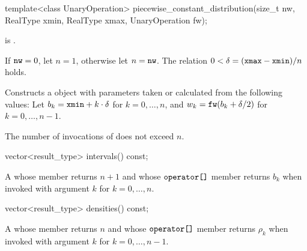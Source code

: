 %
\begin{itemdecl}
template<class UnaryOperation>
 piecewise_constant_distribution(size_t nw, RealType xmin, RealType xmax, UnaryOperation fw);
\end{itemdecl}

\begin{itemdescr}
\pnum
\mandates
{} is .

\pnum
\expects
 If $\texttt{\protect nw} = 0$, let $n = 1$, otherwise let $n = \texttt{\protect nw}$.
 The relation $0 < \delta = (\texttt{\protect xmax} - \texttt{\protect xmin}) / n$
 holds.

\pnum
\effects
Constructs a  object
 with parameters taken or calculated
 from the following values:
 Let $b_k = \texttt{\protect xmin} + k \cdot \delta $ for $ k = 0, \dotsc, n$,
 and $w_k = \texttt{\protect fw}(b_k + \delta / 2) $ for $ k = 0, \dotsc, n - 1$.

\pnum
\complexity
The number of invocations of  does not exceed $n$.
\end{itemdescr}

%
\begin{itemdecl}
vector<result_type> intervals() const;
\end{itemdecl}

\begin{itemdescr}
\pnum
\returns
A 
 whose  member returns $n + 1$
 and whose $ \texttt{\protect operator[]} $ member returns $b_k$
 when invoked with argument $k$ for $k = 0, \dotsc, n $.
\end{itemdescr}

%
\begin{itemdecl}
vector<result_type> densities() const;
\end{itemdecl}

\begin{itemdescr}
\pnum
\returns
A 
 whose  member returns $n$
 and whose $ \texttt{\protect operator[]} $ member returns $\rho_k$
 when invoked with argument $k$ for $k = 0, \dotsc, n - 1$.
\end{itemdescr}



